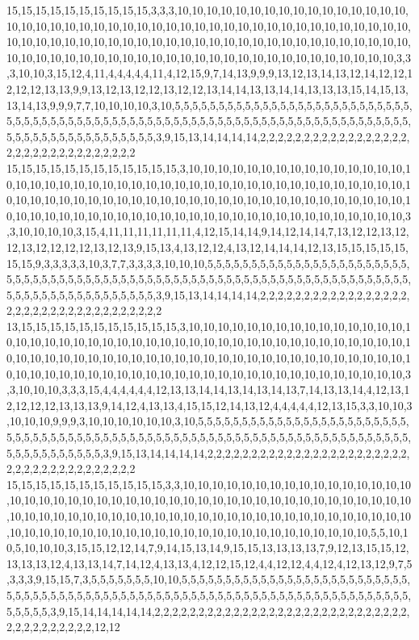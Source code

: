 15,15,15,15,15,15,15,15,15,15,3,3,3,10,10,10,10,10,10,10,10,10,10,10,10,10,10,10,10,10,10,10,10,10,10,10,10,10,10,10,10,10,10,10,10,10,10,10,10,10,10,10,10,10,10,10,10,10,10,10,10,10,10,10,10,10,10,10,10,10,10,10,10,10,10,10,10,10,10,10,10,10,10,10,10,10,10,10,10,10,10,10,10,10,10,10,10,10,10,10,10,10,10,10,10,10,10,10,10,10,10,10,3,3,3,10,10,3,15,12,4,11,4,4,4,4,4,11,4,12,15,9,7,14,13,9,9,9,13,12,13,14,13,12,14,12,12,12,12,12,13,13,9,9,13,12,13,12,12,13,12,12,13,14,14,13,13,14,14,13,13,13,15,14,15,13,13,14,13,9,9,9,7,7,10,10,10,10,3,10,5,5,5,5,5,5,5,5,5,5,5,5,5,5,5,5,5,5,5,5,5,5,5,5,5,5,5,5,5,5,5,5,5,5,5,5,5,5,5,5,5,5,5,5,5,5,5,5,5,5,5,5,5,5,5,5,5,5,5,5,5,5,5,5,5,5,5,5,5,5,5,5,5,5,5,5,5,5,5,5,5,5,5,5,5,5,5,5,5,5,3,9,15,13,14,14,14,14,2,2,2,2,2,2,2,2,2,2,2,2,2,2,2,2,2,2,2,2,2,2,2,2,2,2,2,2,2,2,2,2
15,15,15,15,15,15,15,15,15,15,15,15,3,10,10,10,10,10,10,10,10,10,10,10,10,10,10,10,10,10,10,10,10,10,10,10,10,10,10,10,10,10,10,10,10,10,10,10,10,10,10,10,10,10,10,10,10,10,10,10,10,10,10,10,10,10,10,10,10,10,10,10,10,10,10,10,10,10,10,10,10,10,10,10,10,10,10,10,10,10,10,10,10,10,10,10,10,10,10,10,10,10,10,10,10,10,10,10,10,10,10,10,3,3,10,10,10,10,3,15,4,11,11,11,11,11,11,4,12,15,14,14,9,14,12,14,14,7,13,12,12,13,12,12,13,12,12,12,12,13,12,13,9,15,13,4,13,12,12,4,13,12,14,14,14,12,13,15,15,15,15,15,15,15,9,3,3,3,3,3,10,3,7,7,3,3,3,3,10,10,10,5,5,5,5,5,5,5,5,5,5,5,5,5,5,5,5,5,5,5,5,5,5,5,5,5,5,5,5,5,5,5,5,5,5,5,5,5,5,5,5,5,5,5,5,5,5,5,5,5,5,5,5,5,5,5,5,5,5,5,5,5,5,5,5,5,5,5,5,5,5,5,5,5,5,5,5,5,5,5,5,5,5,5,5,5,5,3,9,15,13,14,14,14,14,2,2,2,2,2,2,2,2,2,2,2,2,2,2,2,2,2,2,2,2,2,2,2,2,2,2,2,2,2,2,2,2,2,2,2
13,15,15,15,15,15,15,15,15,15,15,15,3,10,10,10,10,10,10,10,10,10,10,10,10,10,10,10,10,10,10,10,10,10,10,10,10,10,10,10,10,10,10,10,10,10,10,10,10,10,10,10,10,10,10,10,10,10,10,10,10,10,10,10,10,10,10,10,10,10,10,10,10,10,10,10,10,10,10,10,10,10,10,10,10,10,10,10,10,10,10,10,10,10,10,10,10,10,10,10,10,10,10,10,10,10,10,10,10,10,10,10,3,3,10,10,10,3,3,3,15,4,4,4,4,4,4,12,13,13,14,14,13,14,13,14,13,7,14,13,13,14,4,12,13,12,12,12,12,13,13,13,9,14,12,4,13,13,4,15,15,12,14,13,12,4,4,4,4,4,12,13,15,3,3,10,10,3,10,10,10,9,9,9,3,10,10,10,10,10,10,3,10,5,5,5,5,5,5,5,5,5,5,5,5,5,5,5,5,5,5,5,5,5,5,5,5,5,5,5,5,5,5,5,5,5,5,5,5,5,5,5,5,5,5,5,5,5,5,5,5,5,5,5,5,5,5,5,5,5,5,5,5,5,5,5,5,5,5,5,5,5,5,5,5,5,5,5,5,5,5,5,5,5,3,9,15,13,14,14,14,14,2,2,2,2,2,2,2,2,2,2,2,2,2,2,2,2,2,2,2,2,2,2,2,2,2,2,2,2,2,2,2,2,2,2,2,2,2,2
15,15,15,15,15,15,15,15,15,15,15,3,3,10,10,10,10,10,10,10,10,10,10,10,10,10,10,10,10,10,10,10,10,10,10,10,10,10,10,10,10,10,10,10,10,10,10,10,10,10,10,10,10,10,10,10,10,10,10,10,10,10,10,10,10,10,10,10,10,10,10,10,10,10,10,10,10,10,10,10,10,10,10,10,10,10,10,10,10,10,10,10,10,10,10,10,10,10,10,10,10,10,10,10,10,10,10,10,10,10,5,5,10,10,5,10,10,10,3,15,15,12,12,14,7,9,14,15,13,14,9,15,15,13,13,13,13,7,9,12,13,15,15,12,13,13,13,12,4,13,13,14,7,14,12,4,13,13,4,12,12,15,12,4,4,12,12,4,4,12,4,12,13,12,9,7,5,3,3,3,9,15,15,7,3,5,5,5,5,5,5,5,10,10,5,5,5,5,5,5,5,5,5,5,5,5,5,5,5,5,5,5,5,5,5,5,5,5,5,5,5,5,5,5,5,5,5,5,5,5,5,5,5,5,5,5,5,5,5,5,5,5,5,5,5,5,5,5,5,5,5,5,5,5,5,5,5,5,5,5,5,5,5,5,5,5,5,5,5,5,5,3,9,15,14,14,14,14,14,2,2,2,2,2,2,2,2,2,2,2,2,2,2,2,2,2,2,2,2,2,2,2,2,2,2,2,2,2,2,2,2,2,2,2,2,2,2,2,12,12
